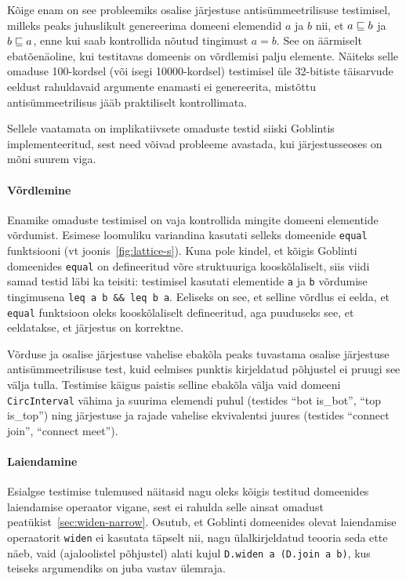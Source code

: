\documentclass[../thesis.tex]{subfiles}
\begin{document}
Kõige enam on see probleemiks osalise järjestuse antisümmeetrilisuse testimisel, milleks peaks juhuslikult genereerima domeeni elemendid $a$ ja $b$ nii, et $a \sqsubseteq b$ ja $b \sqsubseteq a$, enne kui saab kontrollida nõutud tingimust $a = b$. See on äärmiselt ebatõenäoline, kui testitavas domeenis on võrdlemisi palju elemente. Näiteks selle omaduse 100-kordsel (või isegi 10000-kordsel) testimisel üle 32-bitiste täisarvude eeldust rahuldavaid argumente enamasti ei genereerita, mistõttu antisümmeetrilisus jääb praktiliselt kontrollimata.

Sellele vaatamata on implikatiivsete omaduste testid siiski Goblintis implementeeritud, sest need võivad probleeme avastada, kui järjestusseoses on mõni suurem viga.

\paragraph{Võrdlemine}
Enamike omaduste testimisel on vaja kontrollida mingite domeeni elementide võrdumist. Esimese loomuliku variandina kasutati selleks domeenide \texttt{equal} funktsiooni (vt joonis~\ref{fig:lattice-s}). Kuna pole kindel, et kõigis Goblinti domeenides \texttt{equal} on defineeritud võre struktuuriga kooskõlaliselt, siis viidi samad testid läbi ka teisiti: testimisel kasutati elementide \texttt{a} ja \texttt{b} võrdumise tingimusena \texttt{leq a b \&\& leq b a}. Eeliseks on see, et selline võrdlus ei eelda, et \texttt{equal} funktsioon oleks kooskõlaliselt defineeritud, aga puuduseks see, et eeldatakse, et järjestus on korrektne.

Võrduse ja osalise järjestuse vahelise ebakõla peaks tuvastama osalise järjestuse antisümmeetrilisuse test, kuid eelmises punktis kirjeldatud põhjustel ei pruugi see välja tulla. Testimise käigus paistis selline ebakõla välja vaid domeeni \texttt{CircInterval} vähima ja suurima elemendi puhul (testides \enquote{bot is\_bot}, \enquote{top is\_top}) ning järjestuse ja rajade vahelise ekvivalentsi juures (testides \enquote{connect join}, \enquote{connect meet}).

\paragraph{Laiendamine}
Esialgse testimise tulemused näitasid nagu oleks kõigis testitud domeenides laiendamise operaator vigane, sest ei rahulda selle ainsat omadust peatükist~\ref{sec:widen-narrow}. Osutub, et Goblinti domeenides olevat laiendamise operaatorit \texttt{widen} ei kasutata täpselt nii, nagu ülalkirjeldatud teooria seda ette näeb, vaid (ajaloolistel põhjustel) alati kujul \texttt{D.widen a (D.join a b)}, kus teiseks argumendiks on juba vastav ülemraja.
\end{document}
